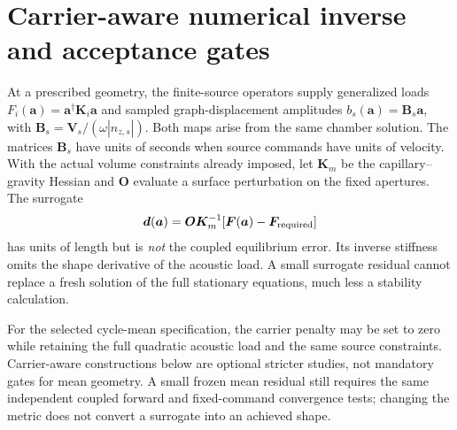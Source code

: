\section{Carrier-aware numerical inverse and acceptance gates}
At a prescribed geometry, the finite-source operators supply generalized loads
$F_i(\bm a)=\bm a^\dagger\bm K_i\bm a$ and sampled graph-displacement
amplitudes $b_s(\bm a)=\bm B_s\bm a$, with
$\bm B_s=\bm V_s/(\omega|n_{z,s}|)$. Both maps arise from the same chamber
solution. The matrices $\bm B_s$ have units of seconds when source commands
have units of velocity. With the actual volume constraints already imposed,
let $\bm K_m$ be the capillary--gravity Hessian and $\bm O$ evaluate a surface
perturbation on the fixed apertures. The surrogate
\begin{equation}
 \bm d(\bm a)=\bm O\bm K_m^{-1}
       [\bm F(\bm a)-\bm F_{\rm required}]
\end{equation}
has units of length but is \emph{not} the coupled equilibrium error.
Its inverse stiffness omits the shape derivative of the acoustic load.
A small surrogate residual cannot replace a fresh solution of the full
stationary equations, much less a stability calculation.

For the selected cycle-mean specification, the carrier penalty may be set
to zero while retaining the full quadratic acoustic load and the same source
constraints. Carrier-aware constructions below are optional stricter studies,
not mandatory gates for mean geometry. A small frozen mean residual still
requires the same independent coupled forward and fixed-command convergence
tests; changing the metric does not convert a surrogate into an achieved shape.

